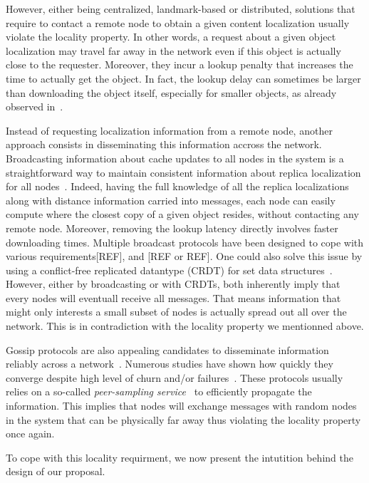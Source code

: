However, either being centralized, landmark-based or distributed, solutions that require to contact a remote node to obtain a given content localization usually violate the locality property. In other words, a request about a given object localization may travel far away in the network even if this object is actually close to the requester.
Moreover, they incur a lookup penalty that increases the time to actually get the object. In fact, the lookup delay can sometimes be larger than downloading the object itself, especially for smaller objects, as already observed in~\cite{confais2017performance}.

Instead of requesting localization information from a remote node, another approach consists in disseminating this information accross the network.
Broadcasting information about cache updates to all nodes in the system is a straightforward way to maintain consistent information about replica localization for all nodes~\cite{nlsr,lscr}. Indeed, having the full knowledge of all the replica localizations along with distance information carried into messages, each node can easily compute where the closest copy of a given object resides, without contacting any remote node. Moreover, removing the lookup latency directly involves faster downloading times. 
Multiple broadcast protocols have been designed to cope with various requirements[REF], and [REF or REF].
One could also solve this issue by using a conflict-free replicated datantype (CRDT) for set data structures~\cite{shapiro2011crdts}. 
However, either by broadcasting or with CRDTs, both inherently imply that every nodes will eventuall receive all messages. 
That means information that might only interests a small subset of nodes is actually spread out all over the network. This is in contradiction 
with the locality property we mentionned above.

Gossip protocols are also appealing candidates to disseminate information reliably across a network~\cite{epidemic-protocol}. Numerous studies have shown how quickly they converge despite high level of churn and/or failures~\cite{lpbcast}.
These protocols usually relies on a so-called \textit{peer-sampling service}~\cite{jelasity2007gossip} to efficiently propagate the information. This implies that nodes will exchange messages with random nodes in the system that can be physically far away thus violating the locality property once again. 

To cope with this locality requirment, we now present the intutition behind the design of our proposal.

